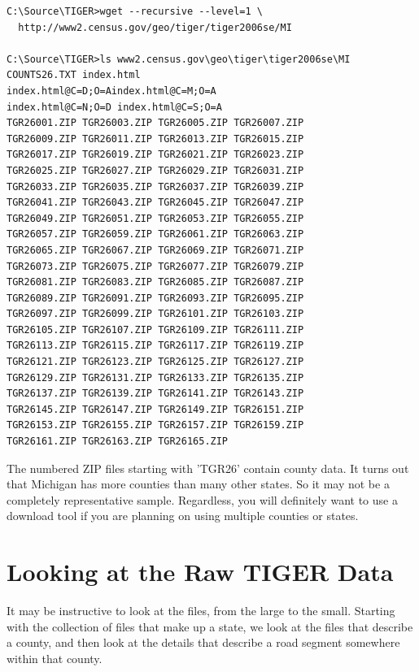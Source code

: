 \documentclass[11pt,letterpaper,onecolumn,twoside,openright,final]{report}
\begin{document}
\begin{verbatim}
C:\Source\TIGER>wget --recursive --level=1 \
  http://www2.census.gov/geo/tiger/tiger2006se/MI

C:\Source\TIGER>ls www2.census.gov\geo\tiger\tiger2006se\MI
COUNTS26.TXT index.html
index.html@C=D;O=Aindex.html@C=M;O=A
index.html@C=N;O=D index.html@C=S;O=A
TGR26001.ZIP TGR26003.ZIP TGR26005.ZIP TGR26007.ZIP
TGR26009.ZIP TGR26011.ZIP TGR26013.ZIP TGR26015.ZIP
TGR26017.ZIP TGR26019.ZIP TGR26021.ZIP TGR26023.ZIP
TGR26025.ZIP TGR26027.ZIP TGR26029.ZIP TGR26031.ZIP
TGR26033.ZIP TGR26035.ZIP TGR26037.ZIP TGR26039.ZIP
TGR26041.ZIP TGR26043.ZIP TGR26045.ZIP TGR26047.ZIP
TGR26049.ZIP TGR26051.ZIP TGR26053.ZIP TGR26055.ZIP
TGR26057.ZIP TGR26059.ZIP TGR26061.ZIP TGR26063.ZIP
TGR26065.ZIP TGR26067.ZIP TGR26069.ZIP TGR26071.ZIP
TGR26073.ZIP TGR26075.ZIP TGR26077.ZIP TGR26079.ZIP
TGR26081.ZIP TGR26083.ZIP TGR26085.ZIP TGR26087.ZIP
TGR26089.ZIP TGR26091.ZIP TGR26093.ZIP TGR26095.ZIP
TGR26097.ZIP TGR26099.ZIP TGR26101.ZIP TGR26103.ZIP
TGR26105.ZIP TGR26107.ZIP TGR26109.ZIP TGR26111.ZIP
TGR26113.ZIP TGR26115.ZIP TGR26117.ZIP TGR26119.ZIP
TGR26121.ZIP TGR26123.ZIP TGR26125.ZIP TGR26127.ZIP
TGR26129.ZIP TGR26131.ZIP TGR26133.ZIP TGR26135.ZIP
TGR26137.ZIP TGR26139.ZIP TGR26141.ZIP TGR26143.ZIP
TGR26145.ZIP TGR26147.ZIP TGR26149.ZIP TGR26151.ZIP
TGR26153.ZIP TGR26155.ZIP TGR26157.ZIP TGR26159.ZIP
TGR26161.ZIP TGR26163.ZIP TGR26165.ZIP
\end{verbatim}


The numbered ZIP files starting with 'TGR26' contain county data.
It turns out that Michigan has more counties than many other states.
So it may not be a completely representative sample.
Regardless, you will definitely want to use a download tool if you are planning on using multiple counties or states.

\section{Looking at the Raw TIGER Data}
It may be instructive to look at the files, from the large to the small.
Starting with the collection of files that make up a state, we look at the files that describe a county, and then look at the details that describe a road segment somewhere within that county.
\end{document}
